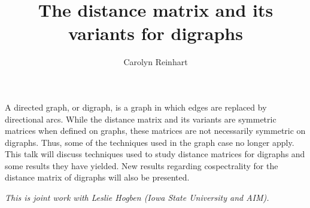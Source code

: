 \documentclass[a4paper]{amsart}
\date{}
\begin{document}
\title{The distance matrix and its variants for digraphs}
\author{Carolyn Reinhart} %
\address{Swarthmore College} %

\maketitle
A directed graph, or digraph, is a graph in which edges are replaced by directional arcs. While the distance matrix and its variants are symmetric matrices when defined on graphs, these matrices are not necessarily symmetric on digraphs. Thus, some of the techniques used in the graph case no longer apply. This talk will discuss techniques used to study distance matrices for digraphs and some results they have yielded. New results regarding cospectrality for the distance matrix of digraphs will also be presented.






\emph{This is joint work with Leslie Hogben (Iowa State University and AIM).}


\end{document}
